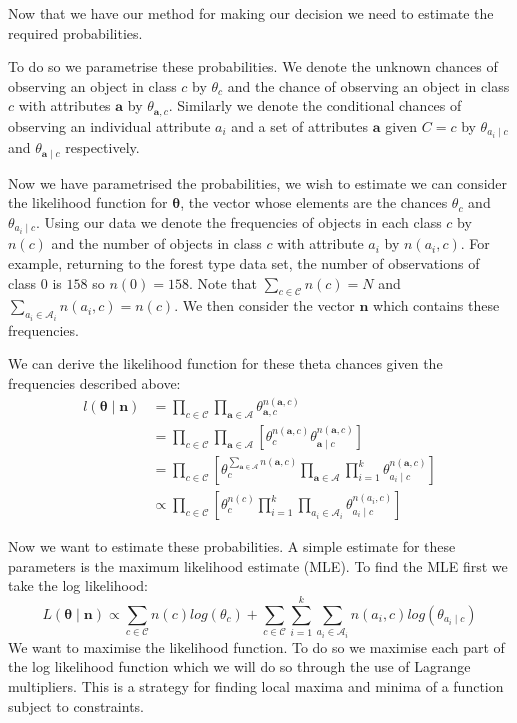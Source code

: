 Now that we have our method for making our decision we need to estimate the required probabilities.

To do so we parametrise these probabilities.
We denote the unknown chances of observing an object in class $c$ by $\theta_c$ and the chance of observing an object in class $c$ with attributes $\mathbf{a}$ by $\theta_{\mathbf{a}, c}$.
Similarly we denote the conditional chances of observing an individual attribute $a_i$ and a set of attributes $\mathbf{a}$ given $C=c$ by $\theta_{a_i \mid c}$ and $\theta_{\mathbf{a} \mid c}$ respectively.

Now we have parametrised the probabilities, we wish to estimate we can consider the likelihood function for $\mathbf{\theta}$, the vector whose elements are the chances $\theta_{c}$ and $\theta_{a_i \mid c}$.
Using our data we denote the frequencies of objects in each class $c$ by $n(c)$ and the number of objects in class $c$ with attribute $a_i$ by $n(a_i, c)$.
For example, returning to the forest type data set, the number of observations of class $0$ is $158$ so $n(0) = 158$.
Note that $\sum_{c \in \mathcal{C}}n(c) = N$ and $\sum_{a_i \in \mathcal{A}_i}n(a_i, c) = n(c)$.
We then consider the vector $\mathbf{n}$ which contains these frequencies.

We can derive the likelihood function for these theta chances given the frequencies described above:
\begin{align} \label{likelihood}
	l(\mathbf{\theta} \mid \mathbf{n}) & =  \prod_{c \in \mathcal{C}} \prod_{\mathbf{a} \in \mathbf{\mathcal{A}}} \theta_{\mathbf{a}, c}^{n(\mathbf{a}, c)} \\
	& = \prod_{c \in \mathcal{C}} \prod_{\mathbf{a} \in \mathbf{\mathcal{A}}} \left[ \theta_{c}^{n(\mathbf{a}, c)} \theta_{\mathbf{a} \mid c}^{n(\mathbf{a}, c)} \right] \\
	& = \prod_{c \in \mathcal{C}} \left[ \theta_{c}^{\sum_{\mathbf{a} \in \mathbf{\mathcal{A}}} n(\mathbf{a}, c)} \prod_{\mathbf{a} \in \mathbf{\mathcal{A}}} \prod_{i=1}^k \theta_{a_i \mid c}^{n(\mathbf{a}, c)} \right] \\
	& \propto \prod_{c \in \mathcal{C}} \left[ \theta_c^{n(c)} \prod_{i=1}^k \prod_{a_i \in \mathcal{A}_i} \theta_{a_i \mid c}^{n(a_i, c)} \right]
\end{align}

Now we want to estimate these probabilities.
A simple estimate for these parameters is the maximum likelihood estimate (MLE).
To find the MLE first we take the log likelihood:
\begin{equation}
	L(\mathbf{\theta} \mid \mathbf{n}) \propto \sum_{c \in \mathcal{C}}  n(c)log(\theta_c) + \sum_{c \in \mathcal{C}} \sum_{i=1}^k \sum_{a_i \in \mathcal{A}_i} n(a_i, c) log(\theta_{a_i \mid c}) 
\end{equation}
We want to maximise the likelihood function.
To do so we maximise each part of the log likelihood function which we will do so through the use of Lagrange multipliers.
This is a strategy for finding local maxima and minima of a function subject to constraints.

